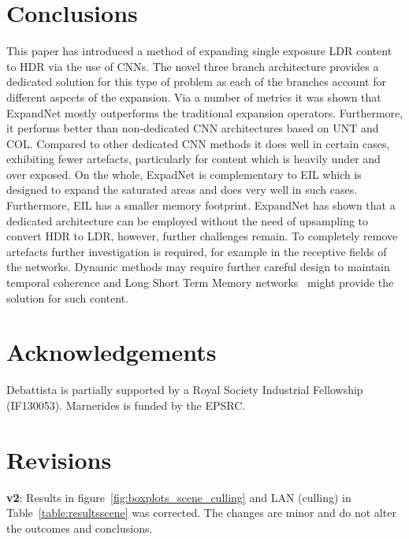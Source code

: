 \documentclass{egpubl}
\newcommand{\tc}[1]{{#1}}
\begin{document}
\section{\textbf{Conclusions}}

This paper has introduced a method of expanding single exposure LDR content to
HDR via the use of CNNs. The novel three branch architecture provides a
dedicated solution for this type of problem as each of the branches account for
different aspects of the expansion. Via a number of metrics it was shown that
ExpandNet mostly outperforms the traditional expansion operators. Furthermore,
it performs better than non-dedicated CNN architectures based on UNT and
COL. \tc{Compared to other dedicated CNN methods
\cite{eilertsen2017cnn,endo2017drtmo} it does well in certain cases, exhibiting
fewer artefacts, particularly for content which is heavily under and over
exposed.} On the whole, ExpadNet is complementary to EIL which is designed to
expand the saturated areas and does very well in such cases. Furthermore, EIL
has a smaller memory footprint. ExpandNet has shown that a dedicated
architecture can be employed without the need of upsampling to convert HDR to
LDR, however, further challenges remain. \tc{To completely remove artefacts
further investigation is required, for example in the receptive fields of the
networks.} Dynamic methods may require further careful design to maintain
temporal coherence and Long Short Term Memory
networks~\cite{hochreiter1997lstm} might provide the solution for such content.


\section*{Acknowledgements}

Debattista is partially supported by a Royal Society Industrial Fellowship (IF130053).
Marnerides is funded by the EPSRC. 
\section*{Revisions}

\textbf{v2}: Results in figure~\ref{fig:boxplots_scene_culling} and LAN (culling)
in Table~\ref{table:resultsscene} was corrected. The changes are minor and
do not alter the outcomes and conclusions.




\end{document}
